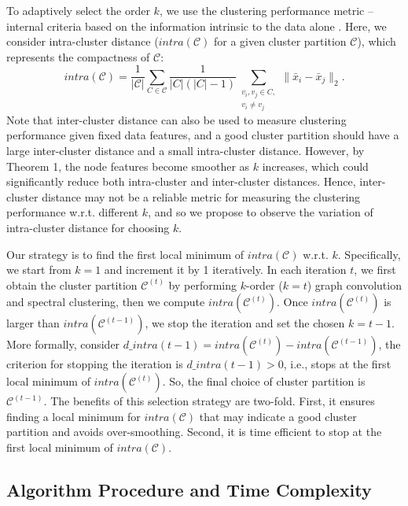 \documentclass{article}
\begin{document}
To adaptively select the order $k$, we use the clustering performance metric -- internal criteria based on the information intrinsic to the data alone \cite{Aggarwal14}. Here, we consider intra-cluster distance ($intra(\mathcal{C})$ for a given cluster partition $\mathcal{C}$), which represents the compactness of $\mathcal{C}$:
\begin{equation} \label{intra}
intra(\mathcal{C})=\frac{1}{|\mathcal{C}|}\sum_{C \in \mathcal{C}}\frac{1}{|C|(|C|-1)}\sum_{\substack{v_i,v_j \in C,\\ v_i\neq v_j}}\|\bar{x}_i-\bar{x}_j\|_2.
\end{equation}
Note that inter-cluster distance can also be used to measure clustering performance given fixed data features, and a good cluster partition should have a large inter-cluster distance and a small intra-cluster distance. However, by Theorem 1, the node features become smoother as $k$ increases, which could significantly reduce both intra-cluster and inter-cluster distances. Hence, inter-cluster distance may not be a reliable metric for measuring the clustering performance w.r.t. different $k$, and so we propose to observe the variation of intra-cluster distance for choosing $k$.



Our strategy is to find the first local minimum of $intra(\mathcal{C})$ w.r.t. $k$. Specifically, we start from $k=1$ and increment it by 1 iteratively. In each iteration $t$, we first obtain the cluster partition $\mathcal{C}^{(t)}$ by performing $k$-order ($k=t$) graph convolution and spectral clustering, then we compute $intra(\mathcal{C}^{(t)})$. Once $intra(\mathcal{C}^{(t)})$ is larger than $intra(\mathcal{C}^{(t-1)})$, we stop the iteration and set the chosen $k=t-1$. More formally, consider $d\_intra(t-1)=intra(\mathcal{C}^{(t)})-intra(\mathcal{C}^{(t-1)})$, the criterion for stopping the iteration is $d\_intra(t-1)>0$, i.e., stops at the first local minimum of $intra(\mathcal{C}^{(t)})$. So, the final choice of cluster partition is $\mathcal{C}^{(t-1)}$. The benefits of this selection strategy are two-fold. First, it ensures finding a local minimum for $intra(\mathcal{C})$ that may indicate a good cluster partition and avoids over-smoothing. Second, it is time efficient to stop at the first local minimum of $intra(\mathcal{C})$.

\subsection{Algorithm Procedure and Time Complexity}
\end{document}
